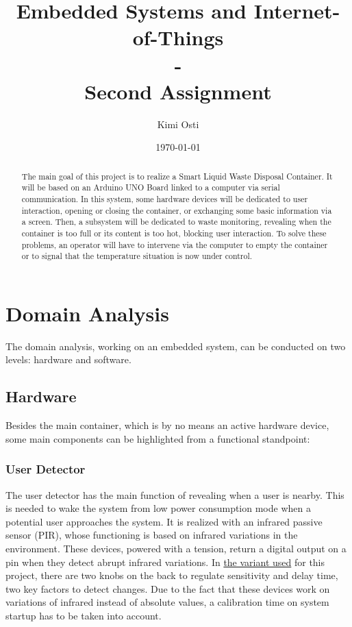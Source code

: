 \documentclass[a4paper,12pt]{report}
\title{Embedded Systems and Internet-of-Things \\ - \\ Second Assignment}
\author{Kimi Osti}
\date{\today}
\begin{document}
	
	\maketitle
	
	\begin{abstract}
		The main goal of this project is to realize a Smart Liquid Waste Disposal Container. It will be based on an Arduino UNO Board linked to a computer via serial communication. In this system, some hardware devices will be dedicated to user interaction, opening or closing the container, or exchanging some basic information via a screen. Then, a subsystem will be dedicated to waste monitoring, revealing when the container is too full or its content is too hot, blocking user interaction. To solve these problems, an operator will have to intervene via the computer to empty the container or to signal that the temperature situation is now under control.
	\end{abstract}
	
	\tableofcontents
	
	\chapter{Domain Analysis}
	The domain analysis, working on an embedded system, can be conducted on two levels: hardware and software.
	
	\section{Hardware}
	Besides the main container, which is by no means an active hardware device, some main components can be highlighted from a functional standpoint:
	
	\subsection{User Detector}
	The user detector has the main function of revealing when a user is nearby. This is needed to wake the system from low power consumption mode when a potential user approaches the system.\newline
	It is realized with an infrared passive sensor (PIR), whose functioning is based on infrared variations in the environment. These devices, powered with a tension, return a digital output on a pin when they detect abrupt infrared variations. In \href{https://learn.adafruit.com/pir-passive-infrared-proximity-motion-sensor/}{the variant used} for this project, there are two knobs on the back to regulate sensitivity and delay time, two key factors to detect changes. Due to the fact that these devices work on variations of infrared instead of absolute values, a calibration time on system startup has to be taken into account.
	
\end{document}
